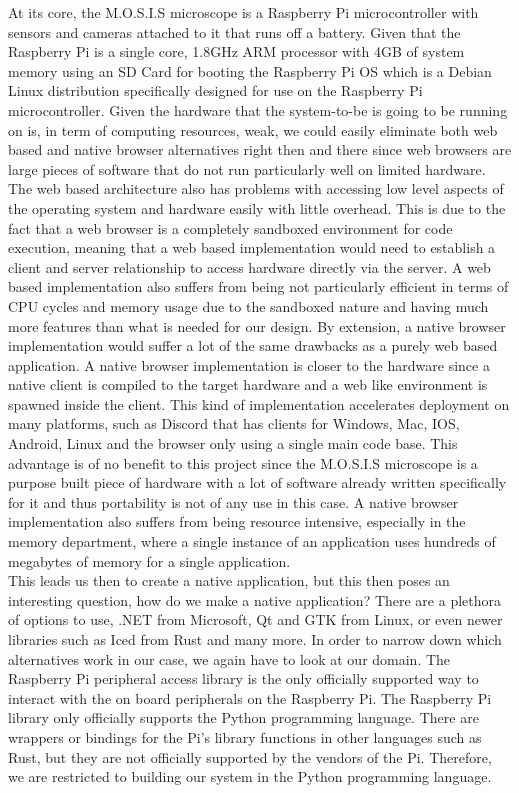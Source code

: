 At its core, the M.O.S.I.S microscope is a Raspberry Pi microcontroller with sensors and cameras attached to it that runs off a battery. Given that the Raspberry Pi is a single core, 1.8GHz ARM processor with 4GB of system memory using an SD Card for booting the Raspberry Pi OS which is a Debian Linux distribution specifically designed for use on the Raspberry Pi microcontroller.\cite{ltdRaspberryPiModel}\cite{DebianUniversalOperating} Given the hardware that the system-to-be is going to be running on is, in term of computing resources, weak, we could easily eliminate both web based and native browser alternatives right then and there since web browsers are large pieces of software that do not run particularly well on limited hardware. The web based architecture also has problems with accessing low level aspects of the operating system and hardware easily with little overhead. This is due to the fact that a web browser is a completely sandboxed environment for code execution, meaning that a web based implementation would need to establish a client and server relationship to access hardware directly via the server. A web based implementation also suffers from being not particularly efficient in terms of CPU cycles and memory usage due to the sandboxed nature and having much more features than what is needed for our design. By extension, a native browser implementation would suffer a lot of the same drawbacks as a purely web based application. A native browser implementation is closer to the hardware since a native client is compiled to the target hardware and a web like environment is spawned inside the client. This kind of implementation accelerates deployment on many platforms, such as Discord that has clients for Windows, Mac, IOS, Android, Linux and the browser only using a single main code base.\cite{Discord2023} This advantage is of no benefit to this project since the M.O.S.I.S microscope is a purpose built piece of hardware with a lot of software already written specifically for it and thus portability is not of any use in this case. A native browser implementation also suffers from being resource intensive, especially in the memory department, where a single instance of an application uses hundreds of megabytes of memory for a single application.\\
This leads us then to create a native application, but this then poses an interesting question, how do we make a native application? There are a plethora of options to use, .NET from Microsoft, Qt and GTK from Linux, or even newer libraries such as Iced from Rust and many more. In order to narrow down which alternatives work in our case, we again have to look at our domain. The Raspberry Pi peripheral access library is the only officially supported way to interact with the on board peripherals on the Raspberry Pi. The Raspberry Pi library only officially supports the Python programming language. There are wrappers or bindings for the Pi's library functions in other languages such as Rust, but they are not officially supported by the vendors of the Pi. Therefore, we are restricted to building our system in the Python programming language.\\
